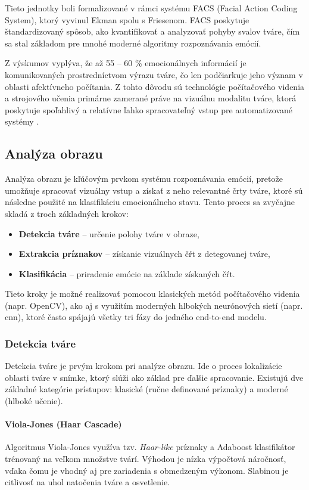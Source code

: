 Tieto jednotky boli formalizované v rámci systému FACS (Facial Action Coding System), ktorý vyvinul Ekman spolu s Friesenom. 
FACS poskytuje štandardizovaný spôsob, ako kvantifikovať a analyzovať pohyby svalov tváre, čím sa stal základom pre mnohé moderné algoritmy rozpoznávania emócií.

Z výskumov vyplýva, že až 55 – 60 \% emocionálnych informácií je komunikovaných prostredníctvom výrazu tváre, čo len podčiarkuje jeho význam v oblasti afektívneho počítania. 
Z tohto dôvodu sú technológie počítačového videnia a strojového učenia primárne zamerané práve na vizuálnu modalitu tváre, ktorá poskytuje spoľahlivý a relatívne ľahko spracovateľný vstup pre automatizované systémy \cite{ekman1978facs}.

\subsection{Analýza obrazu}
Analýza obrazu je kľúčovým prvkom systému rozpoznávania emócií, pretože umožňuje spracovať vizuálny vstup a získať z neho relevantné črty tváre, ktoré sú následne použité na klasifikáciu emocionálneho stavu. Tento proces sa zvyčajne skladá z troch základných krokov:

\begin{itemize}
    \item \textbf{Detekcia tváre} -- určenie polohy tváre v obraze,
    \item \textbf{Extrakcia príznakov} -- získanie vizuálnych čŕt z detegovanej tváre,
    \item \textbf{Klasifikácia} -- priradenie emócie na základe získaných čŕt.
\end{itemize}

Tieto kroky je možné realizovať pomocou klasických metód počítačového videnia (napr. OpenCV), ako aj s využitím moderných hlbokých neurónových sietí (napr. \gls{cnn}), ktoré často spájajú všetky tri fázy do jedného end-to-end modelu.

\subsubsection{Detekcia tváre}
Detekcia tváre je prvým krokom pri analýze obrazu. Ide o proces lokalizácie oblasti tváre v snímke, ktorý slúži ako základ pre ďalšie spracovanie. Existujú dve základné kategórie prístupov: klasické (ručne definované príznaky) a moderné (hlboké učenie).

\paragraph{Viola-Jones (Haar Cascade)}
Algoritmus Viola-Jones využíva tzv. \emph{Haar-like} príznaky a Adaboost klasifikátor trénovaný na veľkom množstve tvárí. Výhodou je nízka výpočtová náročnosť, vďaka čomu je vhodný aj pre zariadenia s obmedzeným výkonom. Slabinou je citlivosť na uhol natočenia tváre a osvetlenie.

